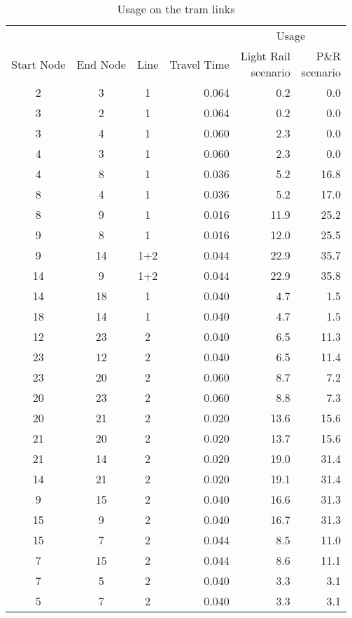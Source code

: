 \begin{table}
    \centering
    \begin{tabular}{cccr|rr}
    \toprule
    \multicolumn{4}{r|}{} & \multicolumn{2}{c}{Usage} \\
    Start Node & End Node & Line & Travel Time & \makecell[b]{Light Rail\\scenario} & \makecell[b]{P\&R\\scenario} \\
    \midrule
    2 & 3 & 1 & 0.064 & 0.2 & 0.0 \\
    3 & 2 & 1 & 0.064 & 0.2 & 0.0 \\
    3 & 4 & 1 & 0.060 & 2.3 & 0.0 \\
    4 & 3 & 1 & 0.060 & 2.3 & 0.0 \\
    4 & 8 & 1 & 0.036 & 5.2 & 16.8 \\
    8 & 4 & 1 & 0.036 & 5.2 & 17.0 \\
    8 & 9 & 1 & 0.016 & 11.9 & 25.2 \\
    9 & 8 & 1 & 0.016 & 12.0 & 25.5 \\
    9 & 14 & 1+2 & 0.044 & 22.9 & 35.7 \\
    14 & 9 & 1+2 & 0.044 & 22.9 & 35.8 \\
    14 & 18 & 1 & 0.040 & 4.7 & 1.5 \\
    18 & 14 & 1 & 0.040 & 4.7 & 1.5 \\
    12 & 23 & 2 & 0.040 & 6.5 & 11.3 \\
    23 & 12 & 2 & 0.040 & 6.5 & 11.4 \\
    23 & 20 & 2 & 0.060 & 8.7 & 7.2 \\
    20 & 23 & 2 & 0.060 & 8.8 & 7.3 \\
    20 & 21 & 2 & 0.020 & 13.6 & 15.6 \\
    21 & 20 & 2 & 0.020 & 13.7 & 15.6 \\
    21 & 14 & 2 & 0.020 & 19.0 & 31.4 \\
    14 & 21 & 2 & 0.020 & 19.1 & 31.4 \\
    9 & 15 & 2 & 0.040 & 16.6 & 31.3 \\
    15 & 9 & 2 & 0.040 & 16.7 & 31.3 \\
    15 & 7 & 2 & 0.044 & 8.5 & 11.0 \\
    7 & 15 & 2 & 0.044 & 8.6 & 11.1 \\
    7 & 5 & 2 & 0.040 & 3.3 & 3.1 \\
    5 & 7 & 2 & 0.040 & 3.3 & 3.1 \\
    \bottomrule
    \end{tabular}
    \caption{Usage on the tram links}
\end{table}
